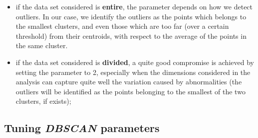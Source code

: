 \documentclass[12pt,a4paper,cucitura]{toptesi}
\begin{document}
\begin{itemize}
\item if the data set considered is \textbf{entire}, the parameter depends on how we detect outliers. In our case, we identify the outliers as the points which belongs to the smallest clusters, and even those which are too far (over a certain threshold) from their centroids, with respect to the average of the points in the same cluster. 
\item if the data set considered is \textbf{divided}, a quite good compromise is achieved by setting the parameter to 2, especially when the dimensions considered in the analysis can capture quite well the variation caused by abnormalities (the outliers will be identified as the points belonging to the smallest of the two clusters, if exists);
\end{itemize}

\subsection{Tuning \emph{DBSCAN} parameters}
\end{document}
